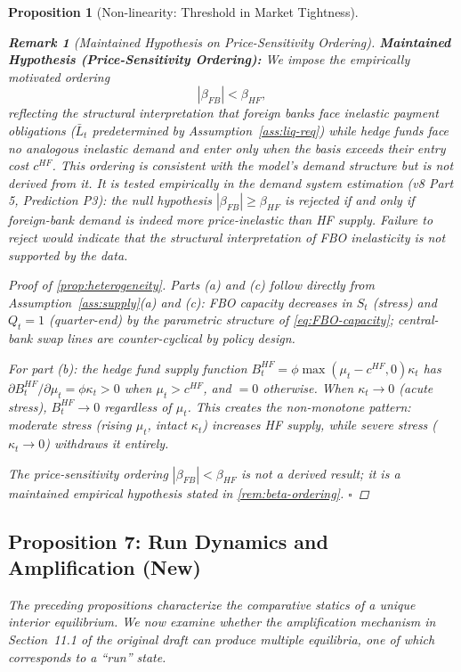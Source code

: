 \documentclass[12pt]{article}
\newtheorem{proposition}{Proposition}
\newtheorem{remark}{Remark}
\theoremstyle{definition}
\newcommand{\1}[1]{\mathds{1}\left[#1\right]}
\begin{document}
\begin{proposition}[Non-linearity: Threshold in Market Tightness]
\begin{remark}[Maintained Hypothesis on Price-Sensitivity Ordering]
  \textbf{Maintained Hypothesis (Price-Sensitivity Ordering):}
  We impose the empirically motivated ordering
  \[
    |\beta_{FB}| < \beta_{HF},
  \]
  reflecting the structural interpretation that foreign banks face inelastic
  payment obligations ($\bar{L}_t$ predetermined by Assumption~\ref{ass:liq-req})
  while hedge funds face no analogous inelastic demand and enter only when the
  basis exceeds their entry cost $c^{HF}$. This ordering is consistent with
  the model's demand structure but is not derived from it. It is tested
  empirically in the demand system estimation (v8 Part 5, Prediction P3): the
  null hypothesis $|\beta_{FB}| \geq \beta_{HF}$ is rejected if and only if
  foreign-bank demand is indeed more price-inelastic than HF supply.
  Failure to reject would indicate that the structural interpretation of FBO
  inelasticity is not supported by the data.
\end{remark}

\begin{proof}[Proof of \cref{prop:heterogeneity}]
  Parts (a) and (c) follow directly from Assumption~\ref{ass:supply}(a) and
  (c): FBO capacity decreases in $S_t$ (stress) and $Q_t = 1$ (quarter-end)
  by the parametric structure of \eqref{eq:FBO-capacity}; central-bank swap
  lines are counter-cyclical by policy design.

  For part (b): the hedge fund supply function $B_t^{HF} = \phi
  \max(\mu_t - c^{HF}, 0)\kappa_t$ has $\partial B_t^{HF}/\partial\mu_t =
  \phi\kappa_t > 0$ when $\mu_t > c^{HF}$, and $= 0$ otherwise. When
  $\kappa_t \to 0$ (acute stress), $B_t^{HF} \to 0$ regardless of $\mu_t$.
  This creates the non-monotone pattern: moderate stress (rising $\mu_t$,
  intact $\kappa_t$) increases HF supply, while severe stress ($\kappa_t \to 0$)
  withdraws it entirely.

  The price-sensitivity ordering $|\beta_{FB}| < \beta_{HF}$ is not a derived
  result; it is a maintained empirical hypothesis stated in \cref{rem:beta-ordering}.
  \hfill$\square$
\end{proof}

\subsection{Proposition 7: Run Dynamics and Amplification (New)}

The preceding propositions characterize the \emph{comparative statics} of a
unique interior equilibrium. We now examine whether the amplification mechanism
in Section~11.1 of the original draft can produce \emph{multiple equilibria},
one of which corresponds to a ``run'' state.


\end{proposition}
\end{document}
